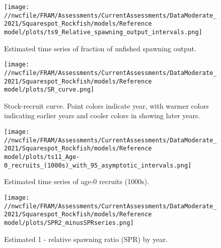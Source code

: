 \documentclass[11pt,
  english,
  a4paper,
]{article}
\begin{document}

\begin{figure}
\centering
\texttt{[image: //nwcfile/FRAM/Assessments/CurrentAssessments/DataModerate\_2021/Squarespot\_Rockfish/models/Reference model/plots/ts9\_Relative\_spawning\_output\_intervals.png]}
\caption{Estimated time series of fraction of unfished spawning output.\label{fig:depl}}
\end{figure}

\tagmcend\tagstructend


\begin{figure}
\centering
\texttt{[image: //nwcfile/FRAM/Assessments/CurrentAssessments/DataModerate\_2021/Squarespot\_Rockfish/models/Reference model/plots/SR\_curve.png]}
\caption{Stock-recruit curve. Point colors indicate year, with warmer colors indicating earlier years and cooler colors in showing later years.\label{fig:bh-curve}}
\end{figure}

\tagmcend\tagstructend


\begin{figure}
\centering
\texttt{[image: //nwcfile/FRAM/Assessments/CurrentAssessments/DataModerate\_2021/Squarespot\_Rockfish/models/Reference model/plots/ts11\_Age-0\_recruits\_(1000s)\_with\_95\_asymptotic\_intervals.png]}
\caption{Estimated time series of age-0 recruits (1000s).\label{fig:recruits}}
\end{figure}

\tagmcend\tagstructend


\begin{figure}
\centering
\texttt{[image: //nwcfile/FRAM/Assessments/CurrentAssessments/DataModerate\_2021/Squarespot\_Rockfish/models/Reference model/plots/SPR2\_minusSPRseries.png]}
\caption{Estimated 1 - relative spawning ratio (SPR) by year.\label{fig:1-spr}}
\end{figure}
\end{document}
